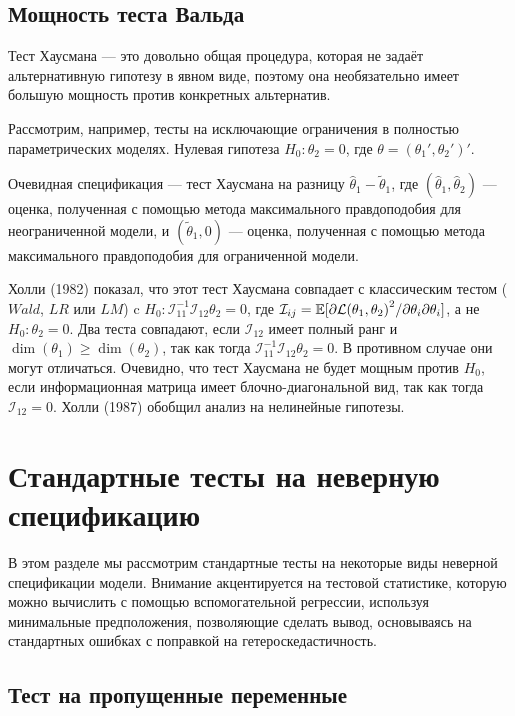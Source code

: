 \subsection{Мощность теста Вальда}

Тест Хаусмана --- это довольно общая процедура, которая не задаёт альтернативную гипотезу в явном виде, поэтому она необязательно имеет большую мощность против конкретных альтернатив. 

Рассмотрим, например, тесты на исключающие ограничения в полностью параметрических моделях. Нулевая гипотеза $H_0: \theta_2 = 0$, где $\theta = (\theta_1', \theta_2')'$. 


Очевидная спецификация --- тест Хаусмана на разницу $\hat{\theta}_1 - \tilde{\theta}_1$, где $(\hat{\theta}_1, \hat{\theta}_2)$ --- оценка, полученная с помощью метода максимального правдоподобия для неограниченной модели, и $(\tilde{\theta}_1, 0)$ --- оценка, полученная с помощью метода максимального правдоподобия для ограниченной модели.

Холли (1982) показал, что этот тест Хаусмана совпадает с классическим тестом ($Wald$, $LR$ или $LM$) c $H_0: \mathcal{I}_{11}^{-1}\mathcal{I}_{12}\theta_2 = 0$, где $\mathcal{I}_{ij} = \mathbb{E}[\partial{\mathcal{L}(\theta_1, \theta_2)}^2/\partial{\theta_i}\partial{\theta_i}]$, а не $H_0: \theta_2 = 0$. Два теста совпадают, если $\mathcal{I}_{12}$ имеет полный ранг и $\dim(\theta_1) \geq \dim(\theta_2)$, так как тогда $\mathcal{I}_{11}^{-1}\mathcal{I}_{12}\theta_2 = 0$. В противном случае они могут отличаться. Очевидно, что тест Хаусмана не будет мощным против $H_0$, если информационная матрица имеет блочно-диагональной вид, так как тогда $\mathcal{I}_{12} = 0$. Холли (1987) обобщил анализ на нелинейные гипотезы.

\section{Стандартные тесты на неверную спецификацию}

В этом разделе мы рассмотрим стандартные тесты на некоторые виды неверной спецификации модели. Внимание акцентируется на тестовой статистике, которую можно вычислить с помощью вспомогательной регрессии, используя минимальные предположения, позволяющие сделать вывод, основываясь на стандартных ошибках с поправкой на гетероскедастичность.

\subsection{Тест на пропущенные переменные}

